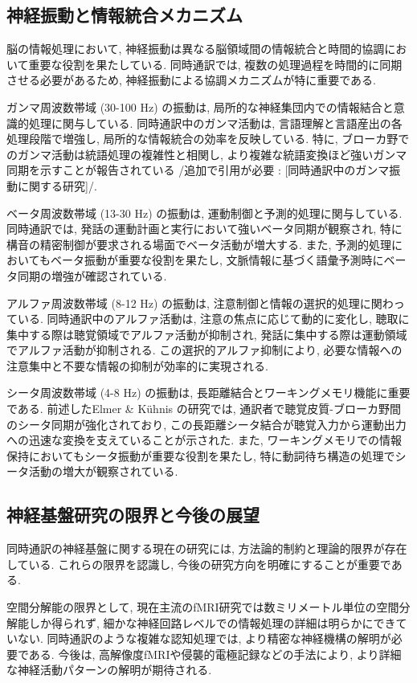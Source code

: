\subsection{神経振動と情報統合メカニズム}

脳の情報処理において, 神経振動は異なる脳領域間の情報統合と時間的協調において重要な役割を果たしている.
同時通訳では, 複数の処理過程を時間的に同期させる必要があるため, 神経振動による協調メカニズムが特に重要である.

ガンマ周波数帯域 (30-100 Hz) の振動は, 局所的な神経集団内での情報結合と意識的処理に関与している.
同時通訳中のガンマ活動は, 言語理解と言語産出の各処理段階で増強し, 局所的な情報統合の効率を反映している.
特に, ブローカ野でのガンマ活動は統語処理の複雑性と相関し, より複雑な統語変換ほど強いガンマ同期を示すことが報告されている {/追加で引用が必要 : [同時通訳中のガンマ振動に関する研究]/}.

ベータ周波数帯域 (13-30 Hz) の振動は, 運動制御と予測的処理に関与している.
同時通訳では, 発話の運動計画と実行において強いベータ同期が観察され, 特に構音の精密制御が要求される場面でベータ活動が増大する.
また, 予測的処理においてもベータ振動が重要な役割を果たし, 文脈情報に基づく語彙予測時にベータ同期の増強が確認されている.

アルファ周波数帯域 (8-12 Hz) の振動は, 注意制御と情報の選択的処理に関わっている.
同時通訳中のアルファ活動は, 注意の焦点に応じて動的に変化し, 聴取に集中する際は聴覚領域でアルファ活動が抑制され, 発話に集中する際は運動領域でアルファ活動が抑制される.
この選択的アルファ抑制により, 必要な情報への注意集中と不要な情報の抑制が効率的に実現される.

シータ周波数帯域 (4-8 Hz) の振動は, 長距離結合とワーキングメモリ機能に重要である.
前述したElmer & Kühnis \cite{elmer2016functional} の研究では, 通訳者で聴覚皮質-ブローカ野間のシータ同期が強化されており, この長距離シータ結合が聴覚入力から運動出力への迅速な変換を支えていることが示された.
また, ワーキングメモリでの情報保持においてもシータ振動が重要な役割を果たし, 特に動詞待ち構造の処理でシータ活動の増大が観察されている.

\subsection{神経基盤研究の限界と今後の展望}

同時通訳の神経基盤に関する現在の研究には, 方法論的制約と理論的限界が存在している.
これらの限界を認識し, 今後の研究方向を明確にすることが重要である.

空間分解能の限界として, 現在主流のfMRI研究では数ミリメートル単位の空間分解能しか得られず, 細かな神経回路レベルでの情報処理の詳細は明らかにできていない.
同時通訳のような複雑な認知処理では, より精密な神経機構の解明が必要である.
今後は, 高解像度fMRIや侵襲的電極記録などの手法により, より詳細な神経活動パターンの解明が期待される.

